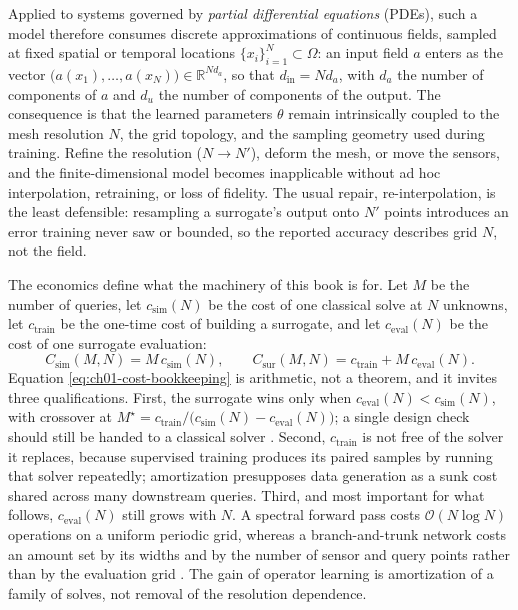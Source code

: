 Applied to systems governed by \emph{partial
differential equations} (PDEs), such a model therefore consumes discrete approximations of
continuous fields, sampled at fixed spatial or temporal locations $\{x_i\}_{i=1}^{N}
\subset \Omega$: an input field $a$ enters as the vector $\big(a(x_1), \dots, a(x_N)\big)
\in \mathbb{R}^{N d_a}$, so that $d_{\text{in}} = N d_a$, with $d_a$ the number of components
of $a$ and $d_u$ the number of components of the output. The consequence is that the
learned parameters $\theta$ remain intrinsically coupled to the mesh resolution $N$, the grid
topology, and the sampling geometry used during training. Refine the resolution
($N \to N'$), deform the mesh, or move the sensors, and the finite-dimensional model becomes
inapplicable without ad hoc interpolation, retraining, or loss of fidelity. The usual repair,
re-interpolation, is the least defensible: resampling a surrogate's output onto $N'$ points
introduces an error training never saw or bounded, so the reported accuracy describes grid
$N$, not the field.

The economics define what the machinery of this book is for. Let $M$ be the number of queries, let $c_{\mathrm{sim}}(N)$ be the cost of one classical
solve at $N$ unknowns, let $c_{\mathrm{train}}$ be the one-time cost of building a surrogate,
and let $c_{\mathrm{eval}}(N)$ be the cost of one surrogate evaluation:
\begin{equation}
  \label{eq:ch01-cost-bookkeeping}
  C_{\mathrm{sim}}(M, N) = M\, c_{\mathrm{sim}}(N),
  \qquad
  C_{\mathrm{sur}}(M, N) = c_{\mathrm{train}} + M\, c_{\mathrm{eval}}(N).
\end{equation}
Equation \eqref{eq:ch01-cost-bookkeeping} is arithmetic, not a theorem, and it invites three
qualifications. First, the surrogate wins only when $c_{\mathrm{eval}}(N) <
c_{\mathrm{sim}}(N)$, with crossover at $M^{\star} = c_{\mathrm{train}} /
\big(c_{\mathrm{sim}}(N) - c_{\mathrm{eval}}(N)\big)$; a single design check should still be
handed to a classical solver \cite{leveque2002finite, quarteroni2008numerical}. Second,
$c_{\mathrm{train}}$ is not free of the solver it replaces, because supervised training
produces its paired samples by running that solver repeatedly; amortization presupposes data
generation as a sunk cost shared across many downstream queries.
Third, and most important for what follows, $c_{\mathrm{eval}}(N)$ still grows with $N$. A
spectral forward pass costs $\mathcal{O}(N \log N)$ operations on a uniform periodic grid,
whereas a branch-and-trunk network costs an amount set by its widths and by the number of
sensor and query points rather than by the evaluation grid
\cite{li2021fourier, lu2021learning}. The gain of operator learning is amortization of a
family of solves, not removal of the resolution dependence.

